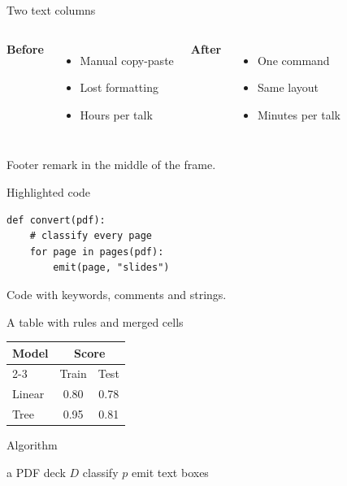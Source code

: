 \documentclass{beamer}
\begin{document}
\begin{frame}{Two text columns}
  \begin{columns}[T]
    \textbf{Before}
    \begin{itemize}
      \item Manual copy-paste
      \item Lost formatting
      \item Hours per talk
    \end{itemize}
    \textbf{After}
    \begin{itemize}
      \item One command
      \item Same layout
      \item Minutes per talk
    \end{itemize}
  \end{columns}
  \vfill
  \centering\small Footer remark in the middle of the frame.
\end{frame}

\begin{frame}[fragile]{Highlighted code}
\begin{lstlisting}
def convert(pdf):
    # classify every page
    for page in pages(pdf):
        emit(page, "slides")
\end{lstlisting}
  Code with keywords, comments and strings.
\end{frame}

\begin{frame}{A table with rules and merged cells}
  \centering
  \begin{tabular}{|l|c|c|}
    \hline
    \multirow{2}{*}{Model} & \multicolumn{2}{c|}{Score} \\
    \cline{2-3}
     & Train & Test \\
    \hline
    Linear & 0.80 & 0.78 \\
    Tree & 0.95 & 0.81 \\
    \hline
  \end{tabular}
\end{frame}

\begin{frame}{Algorithm}
  \begin{algorithmic}[1]
    \Require a PDF deck $D$
      \State classify $p$
        \State emit text boxes
      \EndIf
    \EndFor
  \end{algorithmic}
\end{frame}
\end{document}
